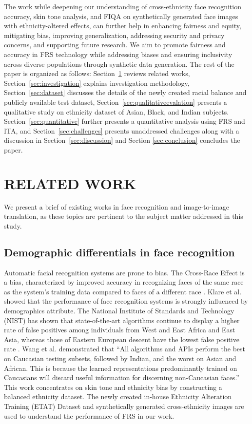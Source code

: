 {The work while deepening our understanding of cross-ethnicity face recognition accuracy, skin tone analysis, and FIQA on synthetically generated face images with ethnicity-altered effects, can further help in enhancing fairness and equity, mitigating bias, improving generalization, addressing security and privacy concerns, and supporting future research. We aim to promote fairness and accuracy in FRS technology while addressing biases and ensuring inclusivity across diverse populations through synthetic data generation. The rest of the paper is organized as follows: Section~\ref{sec:relatedwork} reviews related works, Section~\ref{sec:investigation} explains investigation methodology, Section~\ref{sec:dataset} discusses the details of the newly created racial balance and publicly available test dataset, Section~\ref{sec:qualitativeevalation} presents a qualitative study on ethnicity dataset of Asian, Black, and Indian subjects. Section~\ref{sec:quantitative} further presents a quantitative analysis using FRS and ITA, and Section~\ref{sec:challenges} presents unaddressed challenges along with a discussion in Section~\ref{sec:discussion} and Section \ref{sec:conclusion} concludes the paper. 


\section{RELATED WORK}\label{sec:relatedwork}
We present a brief of existing works in face recognition and image-to-image translation, as these topics are pertinent to the subject matter addressed in this study.

\subsection{Demographic differentials in face recognition}
    Automatic facial recognition systems are prone to bias. The Cross-Race Effect is a bias, characterized by improved accuracy in recognizing faces of the same race as the system's training data compared to faces of a different race \cite{Steven2012}. Klare et al. \cite{JainDemographic2012} showed that the performance of face recognition systems is strongly influenced by demographics attribute.     The National Institute of Standards and Technology (NIST) has shown that state-of-the-art algorithms continue to display a higher rate of false positives among individuals from West and East Africa and East Asia, whereas those of Eastern European descent have the lowest false positive rate \cite{FRVT2019}.
	Wang et al. \cite{Wang_2019_ICCV} demonstrated that ``All algorithms and APIs perform the best on Caucasian testing subsets, followed by Indian, and the worst on Asian and African. This is because the learned representations predominantly trained on Caucasians will discard useful information for discerning non-Caucasian faces.''
	This work concentrates on skin tone and ethnicity bias by constructing a balanced ethnicity dataset. The newly created in-house Ethnicity Alteration Training (ETAT) Dataset and synthetically generated cross-ethnicity images are used to understand the performance of FRS in our work.  	

}

